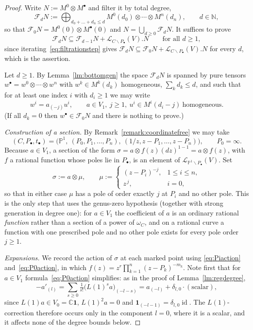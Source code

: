 \documentclass[10pt,a4paper]{amsart}
\newcommand{\C}{\mathbb{C}}
\newcommand{\LL}{\mathcal{L}}
\newcommand{\N}{\mathbb{N}}
\renewcommand{\P}{\mathbb{P}}
\def\bs{\backslash}
\def\ds{\dots}
\newcommand{\id}{\operatorname{id}}
\def\o{\otimes}
\def\om{\omega}
\def\si{\sigma}
\def\ssq{\subseteq}
\def\vac{\mathbf{1}}
\begin{document}
\begin{proof}
Write $N:=M^0\o M^\bullet$ and filter it by total degree,
\[
\mathcal F_d N:=\bigoplus_{d_0+\ds+d_n\leq d} M^0(d_0)\o\cdots\o M^n(d_n),\qquad d\in \N,
\]
so that $\mathcal F_0 N=M^0(0)\o M^\bullet(0)$ and $N=\bigcup_{d\geq 0}\mathcal F_d N$. It
suffices to prove
\begin{equation}\label{eq:filtrationstep}
\mathcal F_d N\ssq \mathcal F_{d-1}N+\LL_{C\bs P_\bullet}(V).N \qquad \text{for all } d\geq 1,
\end{equation}
since iterating~\eqref{eq:filtrationstep} gives
$\mathcal F_dN\ssq \mathcal F_0N+\LL_{C\bs P_\bullet}(V).N$ for every $d$, which is the assertion.

Let $d\geq 1$. By Lemma~\ref{lm:bottomgen} the space $\mathcal F_dN$ is spanned by pure
tensors $w^\bullet=w^0\o\cdots\o w^n$ with $w^k\in M^k(d_k)$ homogeneous,
$\sum_k d_k\leq d$, and such that for at least one index $i$ with $d_i\geq 1$ we may write
\[
w^i=a_{(-j)}u^i,\qquad a\in V_1,\ j\geq 1,\ u^i\in M^i(d_i-j)\ \text{homogeneous}.
\]
(If all $d_k=0$ then $w^\bullet\in\mathcal F_0N$ and there is nothing to prove.)

\emph{Construction of a section.} By Remark~\ref{remark:coordinatefree} we may take
\[
(C,P_\bullet,t_\bullet)=\big(\P^1,\ (P_0,P_1,\ds,P_n),\ (1/z,z-P_1,\ds,z-P_n)\big),
\qquad P_0=\infty.
\]
Because $a\in V_1$, a section of the form $\si=a\o f(z)(dz)^{1-1}=a\o f(z)$,
with $f$ a rational function whose poles lie in $P_\bullet$, is an element of
$\LL_{\P^1\bs P_\bullet}(V)$. Set
\[
\si:=a\o\mu,\qquad
\mu:=\begin{cases}
(z-P_i)^{-j}, & 1\leq i\leq n,\\[2pt]
z^{\,j}, & i=0,
\end{cases}
\]
so that in either case $\mu$ has a pole of order exactly $j$ at $P_i$ and no other pole.
This is the only step that uses the genus-zero hypothesis (together with strong generation in degree one):
for $a\in V_1$ the coefficient of $a$ is an ordinary rational \emph{function} rather than a
section of a power of $\om_C$, and on a rational curve a function with one prescribed pole
and no other pole exists for every pole order $j\geq 1$.

\emph{Expansions.} We record the action of $\si$ at each marked point using
\eqref{eq:Piaction} and~\eqref{eq:P0action}, in which $f(z)=z^r\prod_{k=1}^n(z-P_k)^{-m_k}$.
Note first that for $a\in V_1$ formula~\eqref{eq:P0action} simplifies: as in the proof of
Lemma~\ref{lm:regdegree},
\[
-a'_{(l)}=\sum_{s\geq 0}\tfrac{1}{s!}\big(L(1)^sa\big)_{(-l-s)}=a_{(-l)}+\delta_{l,0}\cdot(\text{scalar}),
\]
since $L(1)a\in V_0=\C\vac$, $L(1)^2a=0$ and $\vac_{(-l-1)}=\delta_{l,0}\id$. The
$L(1)$-correction therefore occurs only in the component $l=0$, where it is a scalar, and it
affects none of the degree bounds below. 


\end{proof}
\end{document}
